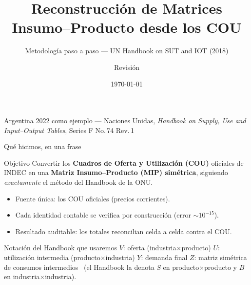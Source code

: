 \documentclass[aspectratio=169,10pt]{beamer}
\title[MIP desde COU]{Reconstrucción de Matrices Insumo--Producto desde los COU}
\subtitle{Metodología paso a paso — UN Handbook on SUT and IOT (2018)}
\author{Revisión}
\date{\today}
\begin{document}
\begin{frame}[plain]
  \titlepage
  \begin{center}\small\color{gris}
  Argentina 2022 como ejemplo — Naciones Unidas, \emph{Handbook on Supply, Use and Input--Output Tables}, Series F No.\,74 Rev.\,1
  \end{center}
\end{frame}

\begin{frame}{Qué hicimos, en una frase}
  \begin{block}{Objetivo}
  Convertir los \textbf{Cuadros de Oferta y Utilización (COU)} oficiales de INDEC en una
  \textbf{Matriz Insumo--Producto (MIP) simétrica}, siguiendo \emph{exactamente} el método del Handbook de la ONU.
  \end{block}
  \begin{itemize}
    \item Fuente única: los COU oficiales (precios corrientes).
    \item Cada identidad contable se verifica por construcción (error $\sim 10^{-15}$).
    \item Resultado auditable: los totales reconcilian celda a celda contra el COU.
  \end{itemize}
  \begin{alertblock}{Notación del Handbook que usaremos}
  $V$: oferta (industria$\times$producto) \quad $U$: utilización intermedia (producto$\times$industria) \quad
  $Y$: demanda final \quad $Z$: matriz simétrica de consumos intermedios
  \footnotesize\color{gris}\ (el Handbook la denota $S$ en producto$\times$producto y $B$ en industria$\times$industria).
  \end{alertblock}
\end{frame}
\end{document}
